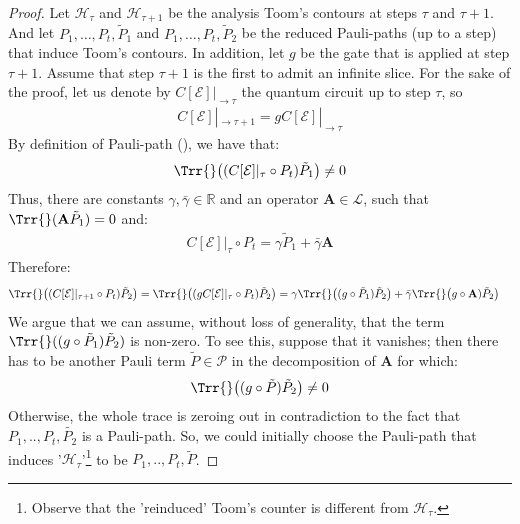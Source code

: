 \begin{proof}
Let $\mathcal{H}_{\tau}$ and $\mathcal{H}_{\tau+1}$ be the analysis Toom's contours at steps $\tau$ and $\tau+1$. And let $P_{1}, \ldots, P_{t}, \tilde{P}_{1}$ and $P_{1}, \ldots, P_{t}, \tilde{P}_{2}$ be the reduced Pauli-paths (up to a step) that induce Toom's contours. In addition, let $g$ be the gate that is applied at step $\tau+1$. Assume that step $\tau+1$ is the first to admit an infinite slice. For the sake of the proof, let us denote by $C[\mathcal{E}]|_{\rightarrow \tau}$ the quantum circuit up to step $\tau$, so
  \begin{equation*}
    \begin{split}
 C[\mathcal{E}]|_{\rightarrow \tau+1} = g C[\mathcal{E}]|_{\rightarrow \tau}  
    \end{split}
  \end{equation*}
By definition of Pauli-path (), we have that:
\begin{equation*}
  \begin{split}
    \Trr{} \big( (C[\mathcal{E}]|_{\tau} \circ P_{t}) \tilde{P}_{1}   \big) \neq 0 
  \end{split}
\end{equation*}
Thus, there are constants $\gamma, \bar{\gamma} \in \mathbb{R}$ and an operator $\mathbf{A} \in \mathcal{L}$, such that $\Trr{} (\mathbf{A} \tilde{P}_{1}) = 0$ and:
\begin{equation*}
  \begin{split}
  C[\mathcal{E}]|_{\tau} \circ P_{t} = \gamma \tilde{P}_{1} + \bar{\gamma} \mathbf{A}
  \end{split}
\end{equation*}
Therefore: 
\begin{equation*}
  \begin{split}
    &\Trr{} \big( (C[\mathcal{E}]|_{\tau + 1} \circ P_{t}) \tilde{P}_{2}   \big) = \Trr{} \big(   (gC[\mathcal{E}]|_{\tau}  \circ P_{t}) \tilde{P}_{2}   \big) = \gamma \Trr{} \big( (g \circ \tilde{P}_{1} )  \tilde{P}_{2} \big) +  \bar{\gamma} \Trr{} \big (g \circ \mathbf{A} )  \tilde{P}_{2}   \big) 
  \end{split}
\end{equation*}
We argue that we can assume, without loss of generality, that the term $ \Trr{} ( (g \circ \tilde{P}_{1} )  \tilde{P}_{2} ) $ is non-zero. To see this, suppose that it vanishes; then there has to be another Pauli term $\tilde{P} \in \mathcal{P}$ in the decomposition of $\mathbf{A}$ for which:
\begin{equation*}
    \begin{split}
      \Trr{} \big( (g \circ \tilde{P} )  \tilde{P}_{2} \big) \neq 0
  \end{split}
\end{equation*}
Otherwise, the whole trace is zeroing out in contradiction to the fact that $P_{1},..,P_{t},\tilde{P_{2}}$ is a Pauli-path. So, we could initially choose the Pauli-path that induces '$\mathcal{H}_{\tau}$'\footnote{Observe that the 'reinduced' Toom's counter is different from $\mathcal{H}_{\tau}$.} to be $P_{1},..,P_{t},\tilde{P}$.




\end{proof}
